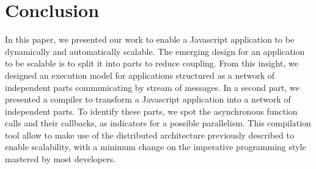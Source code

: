 \section{Conclusion} \label{section:conclusion}

In this paper, we presented our work to enable a Javascript application to be dynamically and automatically scalable.
The emerging design for an application to be scalable is to split it into parts to reduce coupling.
From this insight, we designed an execution model for applications structured as a network of independent parts communicating by stream of messages.
In a second part, we presented a compiler to transform a Javascript application into a network of independent parts.
To identify these parts, we spot the asynchronous function calls and their callbacks, as indicators for a possible parallelism.
This compilation tool allow to make use of the distributed architecture previously described to enable scalability, with a minimum change on the imperative programming style mastered by most developers.